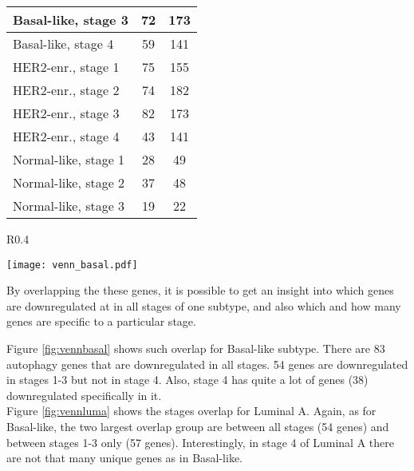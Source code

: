 \begin{table}[!h]
\begin{tabular}{l|c|c}
\multicolumn{1}{|l|}{Basal-like, stage 3} & 72 & \multicolumn{1}{c|}{173} \\ \hline
\multicolumn{1}{|l|}{Basal-like, stage 4} & 59 & \multicolumn{1}{c|}{141} \\ \hline\hline
\multicolumn{1}{|l|}{HER2-enr., stage 1} & 75 & \multicolumn{1}{c|}{155} \\ \hline
\multicolumn{1}{|l|}{HER2-enr., stage 2} & 74 & \multicolumn{1}{c|}{182} \\ \hline
\multicolumn{1}{|l|}{HER2-enr., stage 3} & 82 & \multicolumn{1}{c|}{173} \\ \hline
\multicolumn{1}{|l|}{HER2-enr., stage 4} & 43 & \multicolumn{1}{c|}{141} \\ \hline\hline
\multicolumn{1}{|l|}{Normal-like, stage 1} & 28 & \multicolumn{1}{c|}{49} \\ \hline
\multicolumn{1}{|l|}{Normal-like, stage 2} & 37 & \multicolumn{1}{c|}{48} \\ \hline
\multicolumn{1}{|l|}{Normal-like, stage 3} & 19 & \multicolumn{1}{c|}{22} \\ \hline
\end{tabular}
\end{table}

\newpage


\begin{wrapfigure}{R}{0.4\textwidth}
        \hfill
        \captionsetup{justification=centering}
        \centerline{ \texttt{[image: venn\_basal.pdf]}}
        \label{fig:vennbasal}
        \vspace*{-8mm}
        \caption[Overlap between downregulated autophagy genes in stages of Basal-like subtype]{Overlap between downregulated autophagy genes \\in stages of Basal-like subtype}
        \end{wrapfigure}
 

By overlapping the these genes, it is possible to get an insight into which genes are downregulated at in all stages of one subtype, and also which and how many genes are specific to a particular stage. 

Figure \ref{fig:vennbasal} shows such overlap for Basal-like subtype. There are 83 autophagy genes that are downregulated in all stages. 54 genes are downregulated in stages 1-3 but not in stage 4. Also, stage 4 has quite a lot of genes (38) downregulated specifically in it.\\
Figure \ref{fig:vennluma} shows the stages overlap for Luminal A. Again, as for Basal-like, the two largest overlap group are between all stages (54 genes) and between stages 1-3 only (57 genes). Interestingly, in stage 4 of Luminal A there are not that many unique genes as in Basal-like.\\

